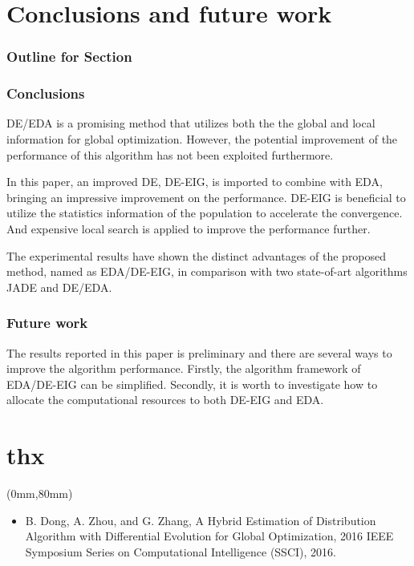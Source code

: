 \documentclass[xcolor=dvipsnames]{beamer}
\newenvironment{reference}[2]{%
  \begin{textblock*}{\textwidth}(#1,#2)
     \bgroup\fontsize{6pt}{\baselineskip}\selectfont\color[RGB]{0,112,192}}{\egroup\end{textblock*}}
\begin{document}
    \section{Conclusions and future work}
    \begin{frame}
      \frametitle{Outline for Section \thesection}
      \tableofcontents[currentsection]
    \end{frame}

    \begin{frame}
    \frametitle{Conclusions}
    DE/EDA is a promising method that utilizes both the the global and local information for global optimization. However, the potential improvement of the performance of this algorithm has not been exploited furthermore.
    \par
     In this paper, an improved DE, DE-EIG, is imported to combine with EDA, bringing an impressive improvement on the performance. DE-EIG is beneficial to utilize the statistics information of the population to accelerate the convergence. And expensive local search is applied to improve the performance further.

     The experimental results have shown the distinct advantages of the proposed method, named as EDA/DE-EIG, in comparison with two state-of-art algorithms JADE and DE/EDA.
    \end{frame}

    \begin{frame}
    \frametitle{Future work}
    The results reported in this paper is preliminary and there are several ways to improve the algorithm performance. Firstly, the algorithm framework of EDA/DE-EIG can be simplified. Secondly, it is worth to investigate how to allocate the computational resources to both DE-EIG and EDA.
    \end{frame}


    \section*{thx}
        \begin{frame}
        \begin{center}
        \fontsize{60pt}{\baselineskip}\selectfont {}
        \end{center}
        \begin{reference}{0mm}{80mm}
        \begin{itemize}
        \item  B. Dong, A. Zhou, and G. Zhang, A Hybrid Estimation of Distribution Algorithm with Differential Evolution for Global Optimization, 2016 IEEE Symposium Series on Computational Intelligence (SSCI), 2016.
        \end{itemize}
        \end{reference}
        \end{frame}
\end{document}

